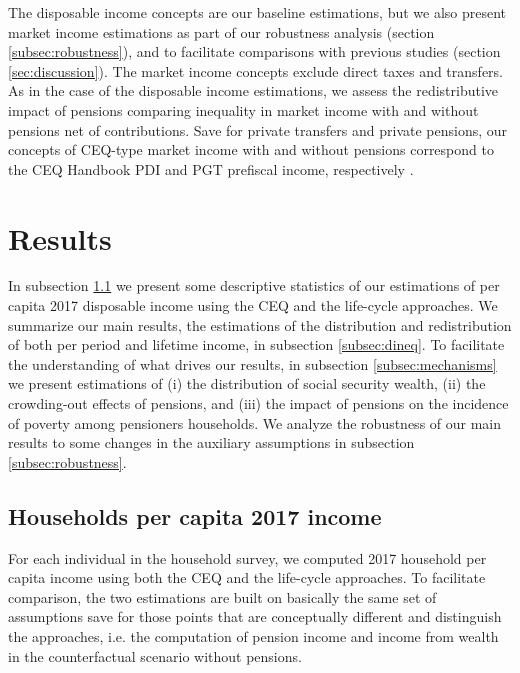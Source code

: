 \documentclass{article}
\begin{document}
The disposable income concepts are our baseline estimations, but we also present market income estimations as part of our robustness analysis (section \ref{subsec:robustness}), and to facilitate comparisons with previous studies (section \ref{sec:discussion}). The market income concepts exclude direct taxes and transfers. As in the case of the disposable income estimations, we assess the redistributive impact of pensions comparing inequality in market income with and without pensions net of contributions. Save for private transfers and private pensions, our concepts of CEQ-type market income with and without pensions correspond to the CEQ Handbook PDI and PGT prefiscal income, respectively 
\parencite[see table 6-5][]{Lustig2022a}.        

\section{Results} \label{sec:results}

In subsection \ref{subsec:descriptive} we present some descriptive statistics of our estimations of per capita 2017 disposable income using the CEQ and the life-cycle approaches. We summarize our main results, the estimations of the distribution and redistribution of both per period and lifetime income, in subsection  \ref{subsec:dineq}. To facilitate the understanding of what drives our results, in subsection \ref{subsec:mechanisms} we present estimations of (i) the distribution of social security wealth, (ii)   the crowding-out effects of pensions,  and  (iii) the impact of pensions on the incidence of poverty among pensioners households. We analyze the robustness of our main results to some changes in the auxiliary assumptions in subsection \ref{subsec:robustness}.    

\subsection{Households per capita 2017 income} \label{subsec:descriptive}

For each individual in the household survey, we computed 2017 household per capita income using both the CEQ and the life-cycle approaches. To facilitate comparison, the two estimations are built on basically the same set of assumptions save for those points that are conceptually different and distinguish the approaches, i.e. the computation of pension income and income from wealth in the counterfactual scenario without pensions.
\end{document}
